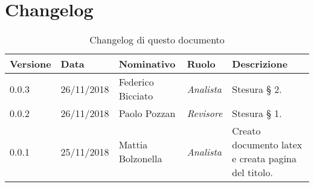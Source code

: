 \section*{Changelog}
\begin{table}[tbph]
        \centering
        \begin{tabularx}{\textwidth}{|l|l|l|l|X|}
                \hline
                \textbf{Versione} & \textbf{Data} & \textbf{Nominativo}  & \textbf{Ruolo} & 
                \textbf{Descrizione}\\
                \hline 
                
                \hline
                0.0.3 & 26/11/2018 & Federico Bicciato & \textit{Analista}
                & Stesura § 2.\\
                
                \hline
                0.0.2 & 26/11/2018 &  Paolo Pozzan & \textit{Revisore}
                & Stesura § 1.\\

                \hline
                0.0.1 & 25/11/2018 & Mattia Bolzonella & \textit{Analista}
                & Creato documento latex e creata pagina del titolo.\\
                
                \hline
                
        \end{tabularx}
        \caption{Changelog di questo documento}
\end{table}